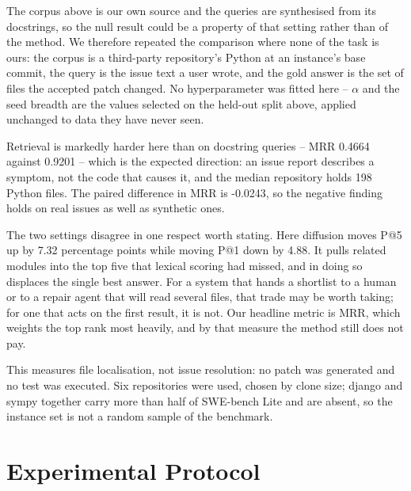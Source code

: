\documentclass[10pt,twocolumn,letterpaper]{article}
\begin{document}
The corpus above is our own source and the queries are synthesised from its
docstrings, so the null result could be a property of that setting rather than of
the method. We therefore repeated the comparison where none of the task is ours:
the corpus is a third-party repository's Python at an instance's base commit, the
query is the issue text a user wrote, and the gold answer is the set of files the
accepted patch changed. No hyperparameter was fitted here -- $\alpha$ and the
seed breadth are the values selected on the held-out split above, applied
unchanged to data they have never seen.
\begin{table}[htbp]
\centering
{}
\end{table}

Retrieval is markedly harder here than on docstring queries -- MRR
0.4664 against 0.9201 -- which is the
expected direction: an issue report describes a symptom, not the code that causes
it, and the median repository holds 198
Python files. The paired difference in MRR is
-0.0243, so the negative finding holds on real
issues as well as synthetic ones.

The two settings disagree in one respect worth stating. Here diffusion moves P@5
up by 7.32
percentage points while moving P@1 down by
4.88. It
pulls related modules into the top five that lexical scoring had missed, and in
doing so displaces the single best answer. For a system that hands a shortlist to
a human or to a repair agent that will read several files, that trade may be
worth taking; for one that acts on the first result, it is not. Our headline
metric is MRR, which weights the top rank most heavily, and by that measure the
method still does not pay.

This measures file localisation, not issue resolution: no patch was generated and
no test was executed. Six repositories were used, chosen by clone size; django and
sympy together carry more than half of SWE-bench Lite and are absent, so the
instance set is not a random sample of the benchmark.




\section{Experimental Protocol}
\end{document}
